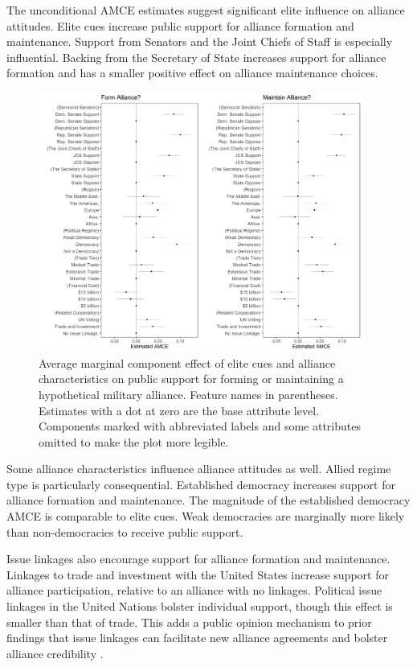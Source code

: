 \documentclass[12pt]{article}
\begin{document}
The unconditional AMCE estimates suggest significant elite influence on alliance attitudes. 
Elite cues increase public support for alliance formation and maintenance. 
Support from Senators and the Joint Chiefs of Staff is especially influential.
Backing from the Secretary of State increases support for alliance formation and has a smaller positive effect on alliance maintenance choices. 


\begin{figure}
	\centering
		\includegraphics[width=0.95\textwidth]{../figures/joint-amce-plots.png}
	\caption{Average marginal component effect of elite cues and alliance characteristics on public support for forming or maintaining a hypothetical military alliance. Feature names in parentheses. Estimates with a dot at zero are the base attribute level. Components marked with abbreviated labels and some attributes omitted to make the plot more legible.}
	\label{fig:joint-plot}
\end{figure}


Some alliance characteristics influence alliance attitudes as well. 
Allied regime type is particularly consequential. 
Established democracy increases support for alliance formation and maintenance.
The magnitude of the established democracy AMCE is comparable to elite cues.   
Weak democracies are marginally more likely than non-democracies to receive public support.


Issue linkages also encourage support for alliance formation and maintenance. 
Linkages to trade and investment with the United States increase support for alliance participation, relative to an alliance with no linkages. 
Political issue linkages in the United Nations bolster individual support, though this effect is smaller than that of trade. 
This adds a public opinion mechanism to prior findings that issue linkages can facilitate new alliance agreements \citep{Poast2012} and bolster alliance credibility \citep{Poast2013}. 
\end{document}
